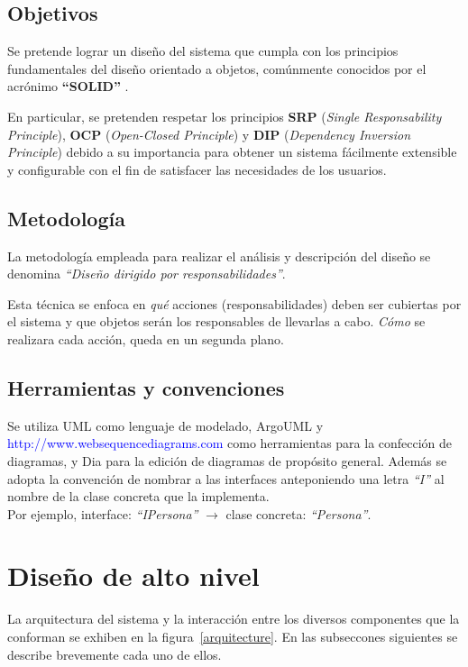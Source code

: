 \documentclass[12pt,a4paper,spanish]{article}
\begin{document}
\subsection{Objetivos}
Se pretende lograr un diseño del sistema que cumpla con los principios
fundamentales del diseño orientado a objetos, comúnmente conocidos por el
acrónimo \textbf{``SOLID''} \cite{martin}.

En particular, se pretenden respetar los principios \textbf{SRP}
(\textit{Single Responsability Principle}), \textbf{OCP} (\textit{Open-Closed
Principle}) y \textbf{DIP} (\textit{Dependency Inversion Principle})
debido a su importancia para obtener un sistema f\'acilmente extensible
y configurable con el fin de satisfacer las necesidades de los usuarios.
  
\subsection{Metodología}
La metodología empleada para realizar el análisis y descripción del
diseño se denomina \emph{``Diseño dirigido por responsabilidades''}\cite{rebecca}. 

Esta técnica se enfoca en \textit{qué} acciones
(responsabilidades) deben ser cubiertas por el sistema 
y que objetos serán los responsables de llevarlas a cabo.
\textit{Cómo} se realizara cada acción, queda en un segunda plano.

\subsection{Herramientas y convenciones}
Se utiliza UML\cite{uml} como lenguaje de modelado, ArgoUML\cite{argoUML} y \\
\textcolor{blue}{http://www.websequencediagrams.com}
como herramientas para la confección de diagramas, y Dia\cite{dia} para la edición
de diagramas de propósito general. Además se adopta la convención de nombrar a
 las interfaces anteponiendo una letra \textit{``I''} al nombre de la clase concreta
que la implementa. \\
Por ejemplo, interface: \textit{``IPersona''} $\to$
clase concreta: \textit{``Persona''}.

\section{Diseño de alto nivel}
\label{highLevel}
La arquitectura del sistema y la interacción entre los diversos componentes que la conforman se exhiben en la figura~\ref{arquitecture}. En las subseccones siguientes se describe brevemente cada uno de ellos.
\end{document}
